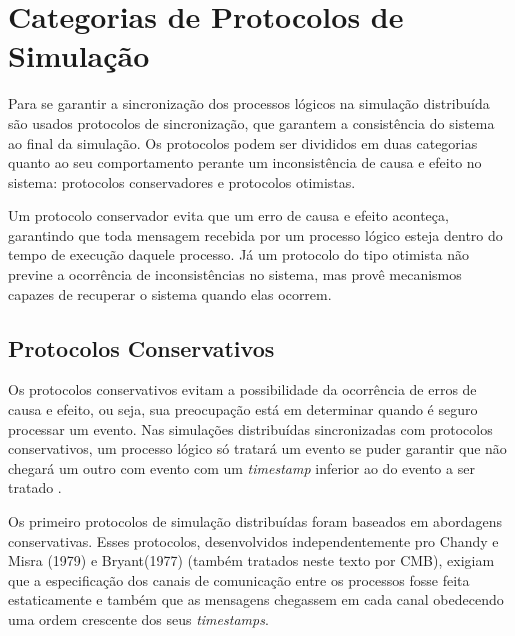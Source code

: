 \section{Categorias de Protocolos de Simulação}


Para se garantir a sincronização dos processos lógicos na simulação distribuída são usados protocolos de sincronização, que garantem a consistência do sistema ao final da simulação. Os protocolos podem ser divididos em duas categorias quanto ao seu comportamento perante um inconsistência de causa e efeito no sistema: protocolos conservadores e protocolos otimistas. 

Um protocolo conservador evita que um erro de causa e efeito aconteça, garantindo que toda mensagem recebida por um processo lógico esteja dentro do tempo de execução daquele processo. Já um protocolo do tipo otimista não previne a ocorrência de inconsistências no sistema, mas provê mecanismos capazes de recuperar o sistema quando elas ocorrem.

\subsection{Protocolos Conservativos}


Os protocolos conservativos evitam a possibilidade da ocorrência de erros de causa e efeito, ou seja, sua preocupação está em determinar quando é seguro processar um evento. Nas simulações distribuídas sincronizadas com protocolos conservativos, um processo lógico só tratará um evento se puder garantir que não chegará um outro com evento com um \textit{timestamp} inferior ao do evento a ser tratado \cite{SRINIVASAN-REYNOLDS-1999}.


Os primeiro protocolos de simulação distribuídas foram baseados em abordagens conservativas. Esses protocolos, desenvolvidos independentemente pro Chandy e Misra (1979) e Bryant(1977) (também tratados neste texto por CMB), exigiam que a especificação dos canais de comunicação entre os processos fosse feita estaticamente e também que as mensagens chegassem em cada canal obedecendo uma ordem crescente dos seus \textit{timestamps}.

